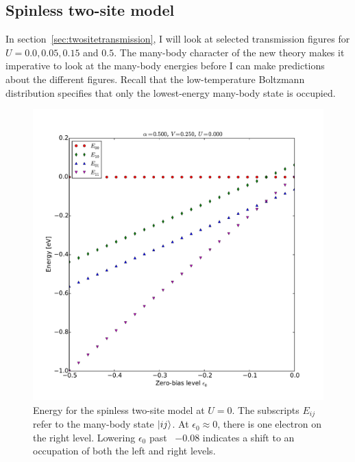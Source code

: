 \subsection{Spinless two-site model}
In section~\ref{sec:twositetransmission}, I will look at selected transmission figures for $U=0.0, 0.05, 0.15$ and $0.5$. The many-body character of the new theory makes it imperative to look at the many-body energies before I can make predictions about the different figures. Recall that the low-temperature Boltzmann distribution specifies that only the lowest-energy many-body state is occupied.
\begin{figure}[!bt]
    \centering
    \includegraphics[height=.45\textheight]{pdf/energy/perrin_distribution_u0.pdf}
    \caption{Energy for the spinless two-site model at $U=0$. The subscripts $E_{ij}$ refer to the many-body state $\ket{i j}$. At $\epsilon_0 \approx 0$, there is one electron on the right level. Lowering $\epsilon_0$ past ~$-0.08$ indicates a shift to an occupation of both the left and right levels.  }
    \label{fig:perrinenergy0}
\end{figure}
